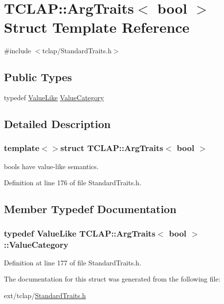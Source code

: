 \hypertarget{struct_t_c_l_a_p_1_1_arg_traits_3_01bool_01_4}{}\section{T\+C\+L\+A\+P\+:\+:Arg\+Traits$<$ bool $>$ Struct Template Reference}
\label{struct_t_c_l_a_p_1_1_arg_traits_3_01bool_01_4}


{\ttfamily \#include $<$tclap/\+Standard\+Traits.\+h$>$}

\subsection*{Public Types}
\begin{DoxyCompactItemize}
\item 
typedef \hyperlink{struct_t_c_l_a_p_1_1_value_like}{Value\+Like} \hyperlink{struct_t_c_l_a_p_1_1_arg_traits_3_01bool_01_4_a86efe13e981aaef96d37ec465a8409a7}{Value\+Category}
\end{DoxyCompactItemize}


\subsection{Detailed Description}
\subsubsection*{template$<$$>$struct T\+C\+L\+A\+P\+::\+Arg\+Traits$<$ bool $>$}

bools have value-\/like semantics. 

Definition at line 176 of file Standard\+Traits.\+h.



\subsection{Member Typedef Documentation}
\hypertarget{struct_t_c_l_a_p_1_1_arg_traits_3_01bool_01_4_a86efe13e981aaef96d37ec465a8409a7}{}
\subsubsection[{Value\+Category}]{\setlength{\rightskip}{0pt plus 5cm}typedef {\bf Value\+Like} {\bf T\+C\+L\+A\+P\+::\+Arg\+Traits}$<$ bool $>$\+::{\bf Value\+Category}}\label{struct_t_c_l_a_p_1_1_arg_traits_3_01bool_01_4_a86efe13e981aaef96d37ec465a8409a7}


Definition at line 177 of file Standard\+Traits.\+h.



The documentation for this struct was generated from the following file\+:\begin{DoxyCompactItemize}
\item 
ext/tclap/\hyperlink{_standard_traits_8h}{Standard\+Traits.\+h}\end{DoxyCompactItemize}
